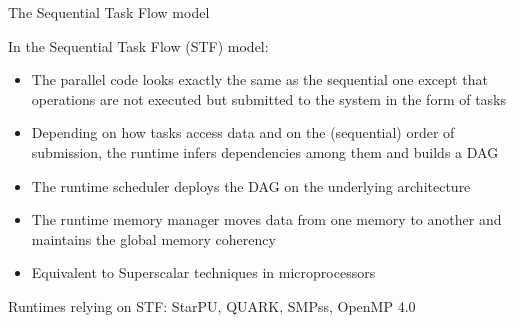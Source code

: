 \begin{frame}{The Sequential Task Flow model}

  \begin{block}{In the Sequential Task Flow (STF) model:}

    \begin{itemize}
    \item The parallel code looks exactly the same as the sequential one
      except that operations are not executed but
      \alert{submitted} to the system in the form of \alert{tasks}
    \item Depending on how tasks access data and on the (sequential) order of submission,
      the runtime infers dependencies among them and builds a DAG
    \item The runtime scheduler deploys the DAG on the
      underlying architecture
    \item The runtime memory manager moves data from one memory to
      another and maintains the global memory coherency
    \item Equivalent to \alert{Superscalar} techniques in microprocessors
    \end{itemize}

  \end{block}

  \vspace{0.2cm}

  Runtimes relying on STF: \alert{StarPU}, QUARK, SMPss, OpenMP 4.0

\end{frame}


